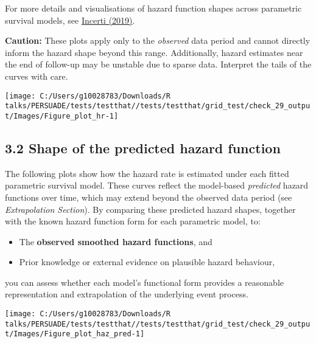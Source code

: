 \documentclass[
]{article}
\providecommand{\tightlist}{%
  \setlength{\itemsep}{0pt}\setlength{\parskip}{0pt}}
\begin{document}
For more details and visualisations of hazard function shapes across
parametric survival models, see
\href{https://devinincerti.com/2019/06/18/parametric_survival.html}{Incerti
(2019)}.

\textbf{Caution:} These plots apply only to the \emph{observed} data
period and cannot directly inform the hazard shape beyond this range.
Additionally, hazard estimates near the end of follow-up may be unstable
due to sparse data. Interpret the tails of the curves with care.

\clearpage

\begin{flushleft}\texttt{[image: C:/Users/g10028783/Downloads/R talks/PERSUADE/tests/testthat//tests/testthat/grid\_test/check\_29\_output/Images/Figure\_plot\_hr-1]} \end{flushleft}

\clearpage

\subsection{3.2 Shape of the predicted hazard
function}\label{shape-of-the-predicted-hazard-function}

The following plots show how the hazard rate is estimated under each
fitted parametric survival model. These curves reflect the model-based
\emph{predicted} hazard functions over time, which may extend beyond the
observed data period (see \emph{Extrapolation Section}). By comparing
these predicted hazard shapes, together with the known hazard function
form for each parametric model, to:

\begin{itemize}
\tightlist
\item
  The \textbf{observed smoothed hazard functions}, and\\
\item
  Prior knowledge or external evidence on plausible hazard behaviour,
\end{itemize}

you can assess whether each model's functional form provides a
reasonable representation and extrapolation of the underlying event
process.

\clearpage

\begin{flushleft}\texttt{[image: C:/Users/g10028783/Downloads/R talks/PERSUADE/tests/testthat//tests/testthat/grid\_test/check\_29\_output/Images/Figure\_plot\_haz\_pred-1]} \end{flushleft}
\end{document}
